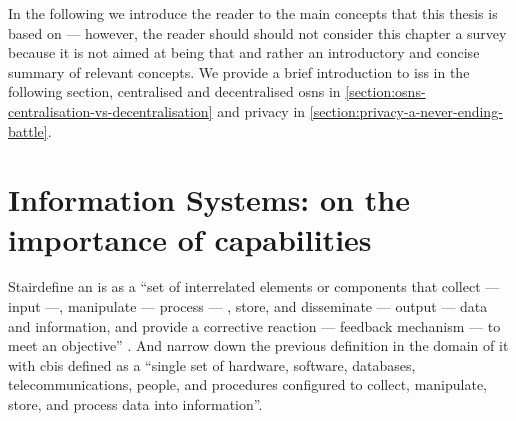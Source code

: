 \documentclass[showtrims,oldfontcommands]{kthesis}
\begin{document}
In the following 
we introduce the reader to the main concepts that this thesis is based on --- however,
the reader should should not consider this chapter a survey because it is not aimed 
at being that and rather an introductory and concise summary of relevant concepts. 
We provide a brief introduction to \acp{is} in the following section,
centralised and decentralised \acp{osn} in \cref{section:osns-centralisation-vs-decentralisation}
and privacy in \cref{section:privacy-a-never-ending-battle}.

\section{Information Systems: on the importance of capabilities}
    \label{section:information-systems-on-the-importance-of-capabilities}

Stair\etal define an \ac{is} as a ``set of interrelated elements or components 
that collect --- input ---, manipulate --- process --- , store, and disseminate 
--- output --- data and information, and provide a corrective reaction --- feedback 
mechanism --- to meet an objective'' \cite{StairR15}. And narrow down the previous 
definition in the domain of \ac{it} with \ac{cbis} defined as a ``single set of 
hardware, software, databases, telecommunications, people, and procedures configured 
to collect, manipulate, store, and process data into information''. 
\end{document}
